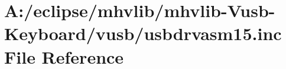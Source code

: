 \hypertarget{mhvlib-_vusb-_keyboard_2vusb_2usbdrvasm15_8inc}{\section{A\-:/eclipse/mhvlib/mhvlib-\/\-Vusb-\/\-Keyboard/vusb/usbdrvasm15.inc File Reference}
\label{mhvlib-_vusb-_keyboard_2vusb_2usbdrvasm15_8inc}
}
